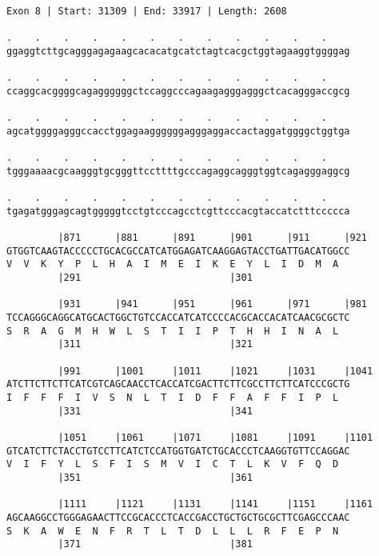 \documentclass{article}
\begin{document}
\newpage
\begin{Verbatim}[fontfamily=courier]
Exon 8 | Start: 31309 | End: 33917 | Length: 2608

.    .    .    .    .    .    .    .    .    .    .    .    
ggaggtcttgcagggagagaagcacacatgcatctagtcacgctggtagaaggtggggag

.    .    .    .    .    .    .    .    .    .    .    .    
ccaggcacggggcagaggggggctccaggcccagaagagggagggctcacagggaccgcg

.    .    .    .    .    .    .    .    .    .    .    .    
agcatggggagggccacctggagaaggggggagggaggaccactaggatggggctggtga

.    .    .    .    .    .    .    .    .    .    .    .    
tgggaaaacgcaagggtgcgggttccttttgcccagaggcagggtggtcagagggaggcg

.    .    .    .    .    .    .    .    .    .    .    .    
tgagatgggagcagtgggggtcctgtcccagcctcgttcccacgtaccatctttccccca

         |871      |881      |891      |901      |911      |921
GTGGTCAAGTACCCCCTGCACGCCATCATGGAGATCAAGGAGTACCTGATTGACATGGCC
V  V  K  Y  P  L  H  A  I  M  E  I  K  E  Y  L  I  D  M  A  
         |291                          |301                 

         |931      |941      |951      |961      |971      |981
TCCAGGGCAGGCATGCACTGGCTGTCCACCATCATCCCCACGCACCACATCAACGCGCTC
S  R  A  G  M  H  W  L  S  T  I  I  P  T  H  H  I  N  A  L  
         |311                          |321                 

         |991      |1001     |1011     |1021     |1031     |1041
ATCTTCTTCTTCATCGTCAGCAACCTCACCATCGACTTCTTCGCCTTCTTCATCCCGCTG
I  F  F  F  I  V  S  N  L  T  I  D  F  F  A  F  F  I  P  L  
         |331                          |341                 

         |1051     |1061     |1071     |1081     |1091     |1101
GTCATCTTCTACCTGTCCTTCATCTCCATGGTGATCTGCACCCTCAAGGTGTTCCAGGAC
V  I  F  Y  L  S  F  I  S  M  V  I  C  T  L  K  V  F  Q  D  
         |351                          |361                 

         |1111     |1121     |1131     |1141     |1151     |1161
AGCAAGGCCTGGGAGAACTTCCGCACCCTCACCGACCTGCTGCTGCGCTTCGAGCCCAAC
S  K  A  W  E  N  F  R  T  L  T  D  L  L  L  R  F  E  P  N  
         |371                          |381                 

\end{Verbatim}
\newpage
\end{document}
